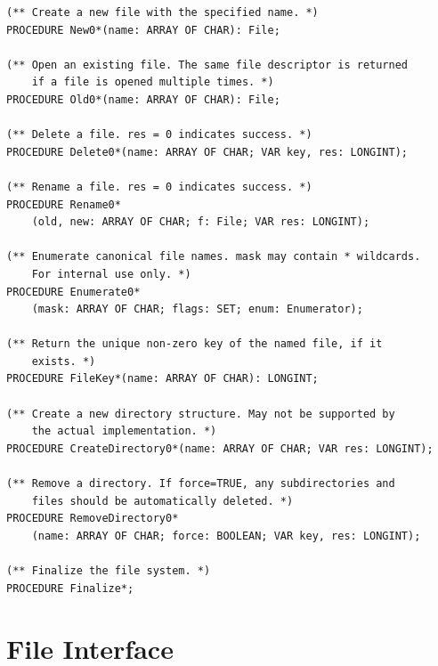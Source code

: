 \documentclass[11pt,a4paper]{book}
\begin{document}
\begin{verbatim}
(** Create a new file with the specified name. *)
PROCEDURE New0*(name: ARRAY OF CHAR): File;
		
(** Open an existing file. The same file descriptor is returned
    if a file is opened multiple times. *)
PROCEDURE Old0*(name: ARRAY OF CHAR): File;

(** Delete a file. res = 0 indicates success. *)
PROCEDURE Delete0*(name: ARRAY OF CHAR; VAR key, res: LONGINT);
		
(** Rename a file. res = 0 indicates success. *)
PROCEDURE Rename0*
    (old, new: ARRAY OF CHAR; f: File; VAR res: LONGINT);
		
(** Enumerate canonical file names. mask may contain * wildcards.
    For internal use only. *)
PROCEDURE Enumerate0*
    (mask: ARRAY OF CHAR; flags: SET; enum: Enumerator);

(** Return the unique non-zero key of the named file, if it
    exists. *)		
PROCEDURE FileKey*(name: ARRAY OF CHAR): LONGINT;
		
(** Create a new directory structure. May not be supported by
    the actual implementation. *)
PROCEDURE CreateDirectory0*(name: ARRAY OF CHAR; VAR res: LONGINT);
	
(** Remove a directory. If force=TRUE, any subdirectories and
    files should be automatically deleted. *)
PROCEDURE RemoveDirectory0*
    (name: ARRAY OF CHAR; force: BOOLEAN; VAR key, res: LONGINT);
		
(** Finalize the file system. *)
PROCEDURE Finalize*;
\end{verbatim}

\section{File Interface}
\end{document}
